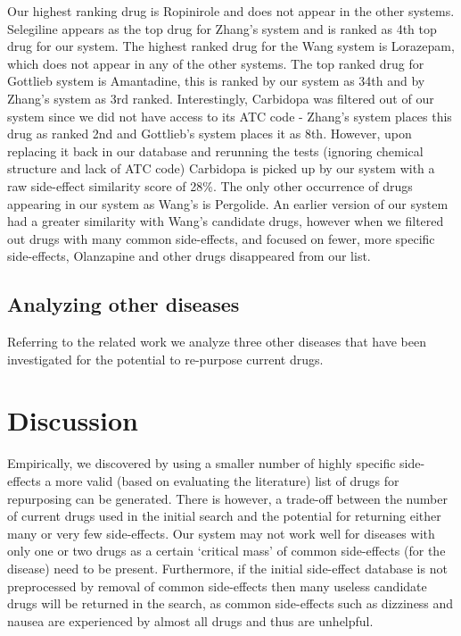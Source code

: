 \documentclass[preprint,12pt]{elsarticle}
\begin{document}
Our highest ranking drug is Ropinirole and does not appear in the other systems. Selegiline appears as the top drug for Zhang's system and is ranked as 4th top drug for our system. The highest ranked drug for the Wang system is Lorazepam, which does not appear in any of the other systems. The top ranked drug for Gottlieb system is Amantadine, this is ranked by our system as 34th and by Zhang's system as 3rd ranked. Interestingly, Carbidopa was filtered out of our system since we did not have access to its ATC code - Zhang's system places this drug as ranked 2nd and Gottlieb's system places it as 8th. However, upon replacing it back in our database and rerunning the tests (ignoring chemical structure and lack of ATC code) Carbidopa is picked up by our system with a raw side-effect similarity score of 28\%. The only other occurrence of drugs appearing in our system as Wang's is Pergolide. An earlier version of our system had a greater similarity with Wang's candidate drugs, however when we filtered out drugs with many common side-effects, and focused on fewer, more specific side-effects, Olanzapine and other drugs disappeared from our list. 

\subsection{Analyzing other diseases}
Referring to the related work we analyze three other diseases that have been investigated for the potential to re-purpose current drugs. 

\section{Discussion}
Empirically, we discovered by using a smaller number of highly specific side-effects a more valid (based on evaluating the literature) list of drugs for repurposing can be generated. There is however, a trade-off between the number of current drugs used in the initial search and the potential for returning either many or very few side-effects. Our system may not work well for diseases with only one or two drugs as a certain `critical mass' of common side-effects (for the disease) need to be present. Furthermore, if the initial side-effect database is not preprocessed by removal of common side-effects then many useless candidate drugs will be returned in the search, as common side-effects such as dizziness and nausea are experienced by almost all drugs and thus are unhelpful. 
\end{document}
